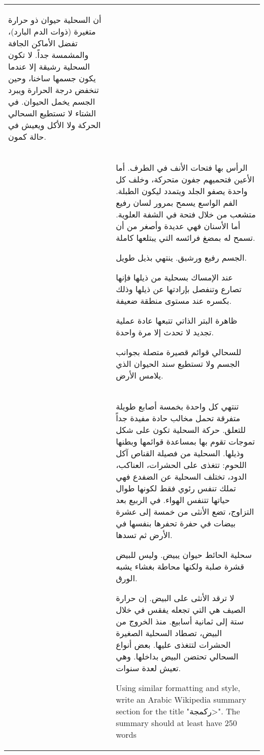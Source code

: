 \begin{center}
\begin{supertabular}{l | p{12cm}}
{\begin{RLtext}
        أن السحلية حيوان ذو حرارة متغيرة (ذوات الدم البارد)، تفضل الأماكن الجافة والمشمسة جداً. لا تكون السحلية رشيقة إلا عندما يكون جسمها ساخنا، وحين تنخفض درجة الحرارة ويبرد الجسم يخمل الحيوان. في الشتاء لا تستطيع السحالي الحركة ولا الأكل ويعيش في حالة كمون.

        \end{RLtext}}\\
        & {\small \begin{RLtext} 



        الرأس بها فتحات الأنف في الطرف. أما الأعين فتحميهم جفون متحركة، وخلف كل واحدة يصفو الجلد ويتمدد ليكون الطبلة. الفم الواسع يسمح بمرور لسان رفيع متشعب من خلال فتحة في الشفة العلوية. أما الأسنان فهي عديدة وأصغر من أن تسمح له بمضغ فرائسه التي يبتلعها كاملة.
        
        الجسم رفيع ورشيق. ينتهي بذيل طويل.
        
        
        
        عند الإمساك بسحلية من ذيلها فإنها تصارع وتنفصل بإرادتها عن ذيلها وذلك بكسره عند مستوى منطقة ضعيفة.
        
        ظاهرة البتر الذاتي تتبعها عادة عملية تجديد لا تحدث إلا مرة واحدة.
        
        للسحالي قوائم قصيرة متصلة بجوانب الجسم ولا تستطيع سند الحيوان الذي يلامس الأرض.
        \end{RLtext}}\\
        & {\small \begin{RLtext}        
        تنتهي كل واحدة بخمسة أصابع طويلة متفرقة تحمل مخالب حادة مفيدة جداً للتعلق. حركة السحلية تكون على شكل تموجات تقوم بها بمساعدة قوائمها وبطنها وذيلها. السحلية من فصيلة القناص آكل اللحوم: تتغذى على الحشرات، العناكب، الدود، تختلف السحلية عن الضفدع فهي تملك تنفس رئوي فقط لكونها طوال حياتها تتنفس الهواء. في الربيع بعد التزاوج، تضع الأنثى من خمسة إلى عشرة بيضات في حفرة تحفرها بنفسها في الأرض ثم تسدها.
        
        سحلية الحائط حيوان يبيض. وليس للبيض قشرة صلبة ولكنها محاطة بغشاء يشبه الورق.
        
        لا ترقد الأنثى على البيض. إن حرارة الصيف هي التي تجعله يفقس في خلال ستة إلى ثمانية أسابيع. منذ الخروج من البيض، تصطاد السحلية الصغيرة الحشرات لتتغذى عليها. بعض أنواع السحالي تحتضن البيض بداخلها. وهي تعيش لعدة سنوات.
        
        \end{RLtext}}
        
        Using similar formatting and style, write an Arabic Wikipedia summary section for the title "\<ركمجة>". The summary should at least have 250 words\\
        

\end{supertabular}
\end{center}
